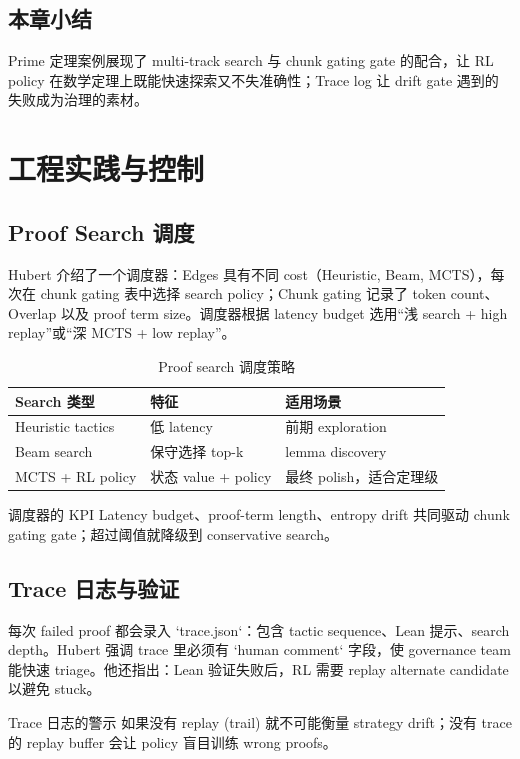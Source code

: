 \documentclass[a4paper]{article}
\begin{document}
\subsection{本章小结}
Prime 定理案例展现了 multi-track search 与 chunk gating gate 的配合，让 RL policy 在数学定理上既能快速探索又不失准确性；Trace log 让 drift gate 遇到的失败成为治理的素材。
\newpage

\section{工程实践与控制}

\subsection{Proof Search 调度}
Hubert 介绍了一个调度器：Edges 具有不同 cost（Heuristic, Beam, MCTS），每次在 chunk gating 表中选择 search policy；Chunk gating 记录了 token count、Overlap 以及 proof term size。调度器根据 latency budget 选用“浅 search + high replay”或“深 MCTS + low replay”。
\begin{table}[H]
\centering
\begin{tabular}{p{4cm}p{4cm}p{4cm}}
\toprule
Search 类型 & 特征 & 适用场景 \\
\midrule
Heuristic tactics & 低 latency & 前期 exploration \\
Beam search & 保守选择 top-k & lemma discovery \\
MCTS + RL policy & 状态 value + policy & 最终 polish，适合定理级 \\
\bottomrule
\end{tabular}
\caption{Proof search 调度策略}
\end{table}
\begin{importantbox}{调度器的 KPI}
Latency budget、proof-term length、entropy drift 共同驱动 chunk gating gate；超过阈值就降级到 conservative search。
\end{importantbox}

\subsection{Trace 日志与验证}
每次 failed proof 都会录入 `trace.json`：包含 tactic sequence、Lean 提示、search depth。Hubert 强调 trace 里必须有 `human comment` 字段，使 governance team 能快速 triage。他还指出：Lean 验证失败后，RL 需要 replay alternate candidate 以避免 stuck。
\begin{warningbox}{Trace 日志的警示}
如果没有 replay (trail) 就不可能衡量 strategy drift；没有 trace 的 replay buffer 会让 policy 盲目训练 wrong proofs。
\end{warningbox}
\end{document}
